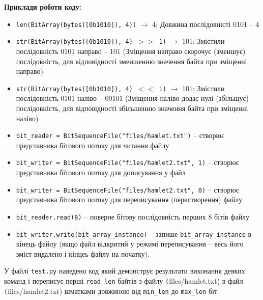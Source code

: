 \documentclass{article}
\def\code#1{\texttt{#1}}
\begin{document}
\textbf{Приклади роботи коду:}
\begin{itemize}
    \item \code{len(BitArray(bytes([0b1010]), 4))} $\rightarrow$  4; Довжина послідовністі 0101 -- 4
    \item \code{str(BitArray(bytes([0b1010]), 4) $>>$ 1)} $\rightarrow$ 101; Змістили послідовність 0101 направо -- 101 (Зміщення направо скорочує (зменшує) послідовність, для відповідності зменшенню значення байта при зміщенні направо)
    \item \code{str(BitArray(bytes([0b1010]), 4) $<<$ 1)} $\rightarrow$ 101; Змістили послідовність 0101 наліво -- 00101 (Зміщення наліво додає нулі (збільшує) послідовність, для відповідності збільшенню значення байта при зміщенні наліво)
    \item \code{bit\_reader = BitSequenceFile("files/hamlet.txt")}  --  створює представника бітового потоку для читання файлу
    \item \code{bit\_writer = BitSequenceFile("files/hamlet2.txt", 1)}  --  створює представника бітового потоку для дописування у файл
    \item \code{bit\_writer = BitSequenceFile("files/hamlet2.txt", 0)}  --  створює представника бітового потоку для переписування (перестворення) файлу
    \item \code{bit\_reader.read(8)} -- поверне бітову послідовність перших 8 бітів файлу
    \item \code{bit\_writer.write(bit\_array\_instance)} -- запише \code{bit\_array\_instance} в кінець файлу (якщо файл відкритий у режимі переписування -- весь його зміст видалено і кінцеь файлу на початку).\\\indent
\end{itemize}
У файлі \code{test.py} наведено код який демонструє результати виконання деяких команд і переписує перші \code{read_len} байтів з файлу \code(files/hamlet.txt) в файл \code(files/hamlet2.txt) шматками довжиною від \code{min\_len} до \code{max\_len} біт
\end{document}
